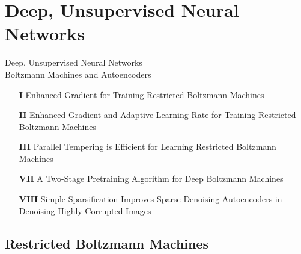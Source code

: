 \documentclass{beamer}
\begin{document}
\section{Deep, Unsupervised Neural Networks}

\begin{frame}{}
    \begin{center}
    Deep, Unsupervised Neural Networks \\
    Boltzmann Machines and Autoencoders
\end{center}

{\scriptsize
\begin{enumerate}
    \item[\textbf{I}] Enhanced
Gradient for Training Restricted Boltzmann Machines

    \item[\textbf{II}] Enhanced Gradient and Adaptive
        Learning Rate for Training Restricted Boltzmann
        Machines

\item[\textbf{III}] 
Parallel Tempering is Efficient for Learning Restricted Boltzmann Machines

\item[\textbf{VII}] A Two-Stage Pretraining Algorithm for
Deep Boltzmann Machines

\item[\textbf{VIII}] Simple Sparsification Improves Sparse Denoising Autoencoders
in Denoising Highly Corrupted Images
\end{enumerate}
}

\end{frame}

\subsection{Restricted Boltzmann Machines}
\end{document}
